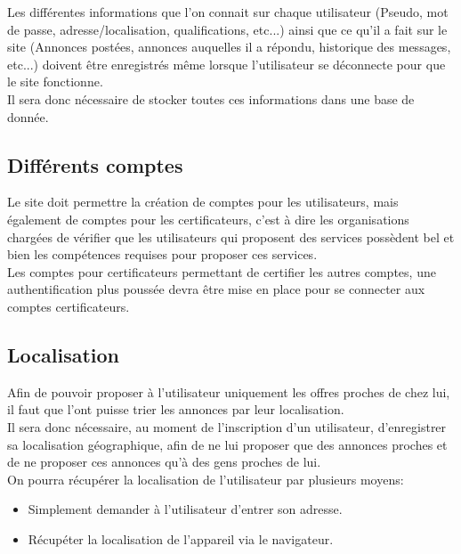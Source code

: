 \documentclass[a4paper,11pt]{article}
\begin{document}
Les différentes informations que l'on connait sur chaque utilisateur (Pseudo, mot de passe,
adresse/localisation, qualifications, etc...) ainsi que ce qu'il a fait sur le site (Annonces postées,
annonces auquelles il a répondu, historique des messages, etc...) doivent être enregistrés même lorsque
l'utilisateur se déconnecte pour que le site fonctionne.\\

Il sera donc nécessaire de stocker toutes ces informations dans une base de donnée.\\

\subsection{Différents comptes}

Le site doit permettre la création de comptes pour les utilisateurs, mais également de comptes
pour les certificateurs, c'est à dire les organisations chargées de vérifier que les utilisateurs
qui proposent des services possèdent bel et bien les compétences requises pour proposer ces services.\\

Les comptes pour certificateurs permettant de certifier les autres comptes, une authentification
plus poussée devra être mise en place pour se connecter aux comptes certificateurs.\\

\subsection{Localisation}

Afin de pouvoir proposer à l'utilisateur uniquement les offres proches de chez lui, il faut que l'ont
puisse trier les annonces par leur localisation.\\

Il sera donc nécessaire, au moment de l'inscription d'un utilisateur, d'enregistrer sa localisation
géographique, afin de ne lui proposer que des annonces proches et de ne proposer ces annonces qu'à des
gens proches de lui.\\

On pourra récupérer la localisation de l'utilisateur par plusieurs moyens:\\
\begin{itemize}
  \item Simplement demander à l'utilisateur d'entrer son adresse.
  \item Récupéter la localisation de l'appareil via le navigateur.
\end{itemize}
\end{document}
